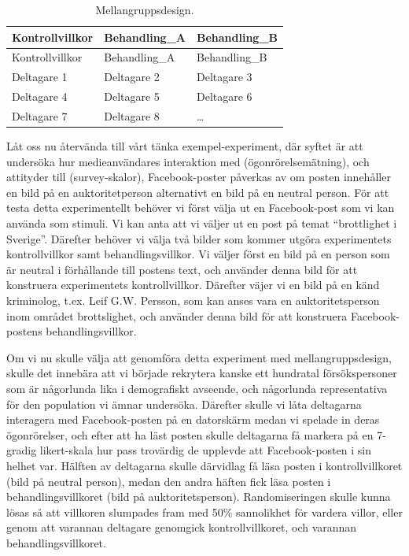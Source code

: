 \documentclass[
]{book}
\begin{document}
\begin{longtable}[]{@{}lll@{}}
\caption{\label{tab:tab-02-07-5-3-01}Mellangruppsdesign.}\tabularnewline
\toprule
Kontrollvillkor & Behandling\_A & Behandling\_B\tabularnewline
\midrule
\endfirsthead
\toprule
Kontrollvillkor & Behandling\_A & Behandling\_B\tabularnewline
\midrule
\endhead
Deltagare 1 & Deltagare 2 & Deltagare 3\tabularnewline
Deltagare 4 & Deltagare 5 & Deltagare 6\tabularnewline
Deltagare 7 & Deltagare 8 & \ldots{}\tabularnewline
\bottomrule
\end{longtable}

Låt oss nu återvända till vårt tänka exempel-experiment, där syftet är att undersöka hur medieanvändares interaktion med (ögonrörelsemätning), och attityder till (survey-skalor), Facebook-poster påverkas av om posten innehåller en bild på en auktoritetperson alternativt en bild på en neutral person. För att testa detta experimentellt behöver vi först välja ut en Facebook-post som vi kan använda som stimuli. Vi kan anta att vi väljer ut en post på temat ``brottlighet i Sverige''. Därefter behöver vi välja två bilder som kommer utgöra experimentets kontrollvillkor samt behandlingsvillkor. Vi väljer först en bild på en person som är neutral i förhållande till postens text, och använder denna bild för att konstruera experimentets kontrollvillkor. Därefter väjer vi en bild på en känd kriminolog, t.ex. Leif G.W. Persson, som kan anses vara en auktoritetsperson inom området brottslighet, och använder denna bild för att konstruera Facebook-postens behandlingsvillkor.

Om vi nu skulle välja att genomföra detta experiment med mellangruppsdesign, skulle det innebära att vi började rekrytera kanske ett hundratal försökspersoner som är någorlunda lika i demografiskt avseende, och någorlunda representativa för den population vi ämnar undersöka. Därefter skulle vi låta deltagarna interagera med Facebook-posten på en datorskärm medan vi spelade in deras ögonrörelser, och efter att ha läst posten skulle deltagarna få markera på en 7-gradig likert-skala hur pass trovärdig de upplevde att Facebook-posten i sin helhet var. Hälften av deltagarna skulle därvidlag få läsa posten i kontrollvillkoret (bild på neutral person), medan den andra häften fick läsa posten i behandlingsvillkoret (bild på auktoritetsperson). Randomiseringen skulle kunna lösas så att villkoren slumpades fram med 50\% sannolikhet för vardera villor, eller genom att varannan deltagare genomgick kontrollvillkoret, och varannan behandlingsvillkoret.
\end{document}
